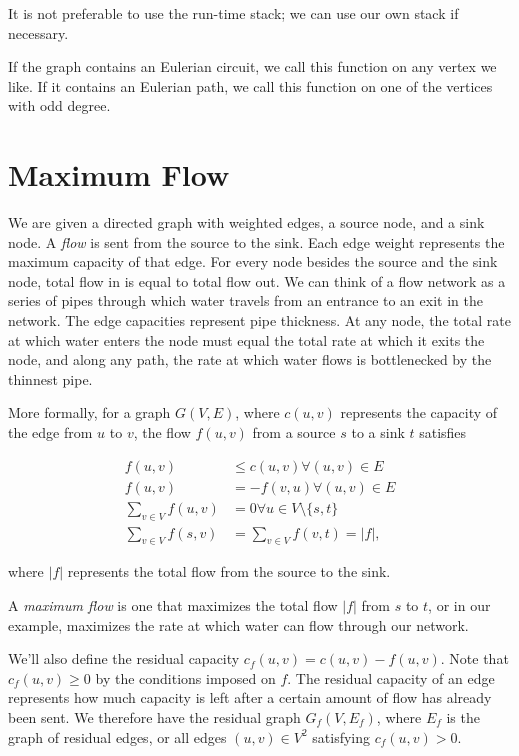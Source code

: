 It is not preferable to use the run-time stack; we can use our own stack if necessary.

If the graph contains an Eulerian circuit, we call this function on any vertex we like. If it contains an Eulerian path, we call this function on one of the vertices with odd degree.

\section{Maximum Flow}

We are given a directed graph with weighted edges, a source node, and a sink node. A \textit{flow} is sent from the source to the sink. Each edge weight represents the maximum capacity of that edge. For every node besides the source and the sink node, total flow in is equal to total flow out. We can think of a flow network as a series of pipes through which water travels from an entrance to an exit in the network. The edge capacities represent pipe thickness. At any node, the total rate at which water enters the node must equal the total rate at which it exits the node, and along any path, the rate at which water flows is bottlenecked by the thinnest pipe.

More formally, for a graph $G(V,E)$, where $c(u,v)$ represents the capacity of the edge from $u$ to $v$, the flow $f(u,v)$ from a source $s$ to a sink $t$ satisfies

\begin{align*}
f(u,v) &\le c(u,v) \forall (u,v) \in E \\
f(u,v) &= -f(v,u) \forall (u,v) \in E \\
\sum_{v \in V} f(u,v) &= 0 \forall u \in V \setminus \{s,t\} \\
\sum_{v \in V} f(s,v) &= \sum_{v \in V} f(v,t) = |f|,
\end{align*}

where $|f|$ represents the total flow from the source to the sink.

A \textit{maximum flow} is one that maximizes the total flow $|f|$ from $s$ to $t$, or in our example, maximizes the rate at which water can flow through our network.

We'll also define the residual capacity $c_f(u,v) = c(u,v) - f(u,v)$. Note that $c_f(u,v) \ge 0$ by the conditions imposed on $f$. The residual capacity of an edge represents how much capacity is left after a certain amount of flow has already been sent. We therefore have the residual graph $G_f(V,E_f)$, where $E_f$ is the graph of residual edges, or all edges $(u,v) \in V^2$ satisfying $c_f(u,v) > 0$.

